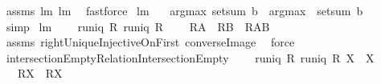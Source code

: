 \begin{isabellebody}
\ assms\ lm{}{}{}\ lm{}{}{}\ \isamarkupfalse%
\ fastforce%
\endisatagproof
{\isafoldproof}%
%
\isadelimproof
\isanewline
%
\endisadelimproof
\isanewline
{}\isamarkupfalse%
\ lm{}{}{}{\isacharcolon}\ \isanewline
\ \ {\isachardoublequoteopen}argmax\ {\isacharparenleft}setsum{\isacharprime}\ b{\isacharparenright}\ {\isacharequal}\ {\isacharparenleft}argmax\ {\isasymcirc}\ setsum{\isacharprime}{\isacharparenright}\ b{\isachardoublequoteclose}\ \isanewline
%
\isadelimproof
\ \ %
\endisadelimproof
%
\isatagproof
{}\isamarkupfalse%
\ simp%
\endisatagproof
{\isafoldproof}%
%
\isadelimproof
%
\endisadelimproof
%
\isamarkuptrue%
\isamarkupfalse%
\ lm{}{}{}{\isacharcolon}\ \isanewline
\ \ \ {\isachardoublequoteopen}runiq\ R{\isachardoublequoteclose}\ {\isachardoublequoteopen}runiq\ {\isacharparenleft}R{\isacharcircum}{\isacharminus}{}{\isacharparenright}{\isachardoublequoteclose}\ \isanewline
\ \ \ {\isachardoublequoteopen}{\isacharparenleft}R{\isacharbackquote}{\isacharbackquote}A{\isacharparenright}\ {\isasyminter}\ {\isacharparenleft}R{\isacharbackquote}{\isacharbackquote}B{\isacharparenright}\ {\isacharequal}\ R{\isacharbackquote}{\isacharbackquote}{\isacharparenleft}A{\isasyminter}B{\isacharparenright}{\isachardoublequoteclose}\ \isanewline
%
\isadelimproof
\ \ %
\endisadelimproof
%
\isatagproof
{}\isamarkupfalse%
\ assms\ rightUniqueInjectiveOnFirst\ converse{\isacharunderscore}Image\ \isamarkupfalse%
\ force%
\endisatagproof
{\isafoldproof}%
%
\isadelimproof
\isanewline
%
\endisadelimproof
\isanewline
{}\isamarkupfalse%
\ intersectionEmptyRelationIntersectionEmpty{\isacharcolon}\ \isanewline
\ \ \ {\isachardoublequoteopen}runiq\ {\isacharparenleft}R{\isacharcircum}{\isacharminus}{}{\isacharparenright}{\isachardoublequoteclose}\ {\isachardoublequoteopen}runiq\ R{\isachardoublequoteclose}\ {\isachardoublequoteopen}X{}\ {\isasyminter}\ X{}\ {\isacharequal}\ {\isacharbraceleft}{\isacharbraceright}{\isachardoublequoteclose}\ \isanewline
\ \ \ {\isachardoublequoteopen}{\isacharparenleft}R{\isacharbackquote}{\isacharbackquote}X{}{\isacharparenright}\ {\isasyminter}\ {\isacharparenleft}R{\isacharbackquote}{\isacharbackquote}X{}{\isacharparenright}\ {\isacharequal}\ {\isacharbraceleft}{\isacharbraceright}{\isachardoublequoteclose}\isanewline

\end{isabellebody}
